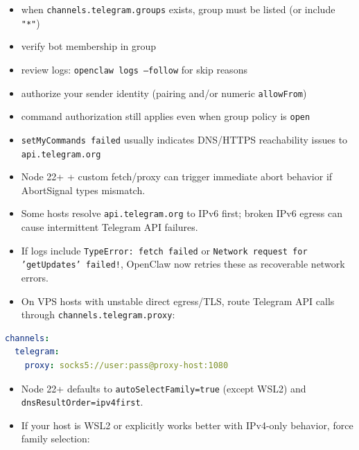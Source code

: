 \begin{itemize}
  \item when \texttt{channels.telegram.groups} exists, group must be listed (or include \texttt{"*"})
  \item verify bot membership in group
  \item review logs: \texttt{openclaw logs --follow} for skip reasons
\end{itemize}




\begin{itemize}
  \item authorize your sender identity (pairing and/or numeric \texttt{allowFrom})
  \item command authorization still applies even when group policy is \texttt{open}
  \item \texttt{setMyCommands failed} usually indicates DNS/HTTPS reachability issues to \texttt{api.telegram.org}
\end{itemize}




\begin{itemize}
  \item Node 22+ + custom fetch/proxy can trigger immediate abort behavior if AbortSignal types mismatch.
  \item Some hosts resolve \texttt{api.telegram.org} to IPv6 first; broken IPv6 egress can cause intermittent Telegram API failures.
  \item If logs include \texttt{TypeError: fetch failed} or \texttt{Network request for 'getUpdates' failed!}, OpenClaw now retries these as recoverable network errors.
  \item On VPS hosts with unstable direct egress/TLS, route Telegram API calls through \texttt{channels.telegram.proxy}:
\end{itemize}


\begin{lstlisting}[language=yaml]
channels:
  telegram:
    proxy: socks5://user:pass@proxy-host:1080
\end{lstlisting}


\begin{itemize}
  \item Node 22+ defaults to \texttt{autoSelectFamily=true} (except WSL2) and \texttt{dnsResultOrder=ipv4first}.
  \item If your host is WSL2 or explicitly works better with IPv4-only behavior, force family selection:
\end{itemize}


